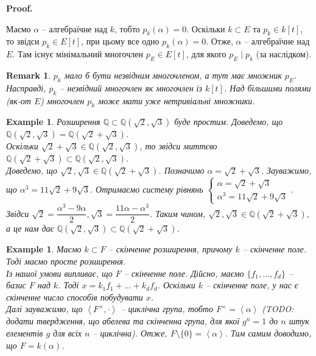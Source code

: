 \documentclass[a4paper, 10pt]{article}
\makeatletter
\theoremstyle{theoremdd}
\theoremstyle{theoremdd}
\theoremstyle{theoremdd}
\theoremstyle{theoremdd}
\theoremstyle{theoremdd}
\newtheorem{example}[theorem]{Example}
\theoremstyle{theoremdd}
\theoremstyle{theoremdd}
\theoremstyle{theoremdd}
\theoremstyle{theoremdd}
\theoremstyle{theoremdd}
\theoremstyle{theoremdd}
\newtheorem{remark}[theorem]{Remark}
\theoremstyle{theoremdd}
\theoremstyle{theoremdd}
\theoremstyle{theoremdd}
\theoremstyle{theoremdd}
\renewenvironment{proof}[1][Proof.\\]{\par
\pushQED{\hfill \qed}%
\normalfont \topsep6\p@\@plus6\p@\relax
\trivlist
\item\relax
{\bfseries
#1\@addpunct{.}}\hspace\labelsep\ignorespaces
}{%
\popQED\endtrivlist\@endpefalse
}
\makeatother
\begin{document}
\begin{proof}
Маємо $\alpha$ -- алгебраїчне над $k$, тобто $p_k(\alpha) = 0$. Оскільки $k \subset E$ та $p_k \in k[t]$, то звідси $p_k \in E[t]$, при цьому все одно $p_k(\alpha) = 0$. Отже, $\alpha$ -- алгебраїчне над $E$. Там існує мінімальний многочлен $p_E \in E[t]$, для якого $p_E \mid p_k$ (за наслідком).
\end{proof}

\begin{remark}
$p_k$ мало б бути незвідним многочленом, а тут має множник $p_E$. Насправді, $p_k$ -- незвідний многочлен як многочлен із $k[t]$. Над більшими полями (як-от $E$) многочлен $p_k$ може мати уже нетривіальні множники.
\end{remark}

\begin{example}
Розширення $\mathbb{Q} \subset \mathbb{Q}(\sqrt{2},\sqrt{3})$ буде простим. Доведемо, що $\mathbb{Q}(\sqrt{2},\sqrt{3}) = \mathbb{Q}(\sqrt{2}+\sqrt{3})$.\\
Оскільки $\sqrt{2}+\sqrt{3} \in \mathbb{Q}(\sqrt{2},\sqrt{3})$, то звідси миттєво $\mathbb{Q}(\sqrt{2}+\sqrt{3}) \subset \mathbb{Q}(\sqrt{2},\sqrt{3})$.\\
Доведемо, що $\sqrt{2},\sqrt{3} \in \mathbb{Q}(\sqrt{2}+\sqrt{3})$. Позначимо $\alpha = \sqrt{2} + \sqrt{3}$. Зауважимо, що $\alpha^3 = 11 \sqrt{2} + 9 \sqrt{3}$. Отримаємо систему рівнянь $\begin{cases} \alpha = \sqrt{2} + \sqrt{3} \\ \alpha^3 = 11 \sqrt{2} + 9 \sqrt{3} \end{cases}$. Звідси $\sqrt{2} = \dfrac{\alpha^3 - 9 \alpha}{2}, \sqrt{3} = \dfrac{11\alpha - \alpha^3}{2}$. Таким чином, $\sqrt{2}, \sqrt{3} \in \mathbb{Q}(\sqrt{2}+\sqrt{3})$, а це нам дає $\mathbb{Q}(\sqrt{2},\sqrt{3}) \subset \mathbb{Q}(\sqrt{2}+\sqrt{3})$.
\end{example}

\begin{example}
\label{finite_extension_of_a_finite_field_is_simple}
Маємо $k \subset F$ -- скінченне розширення, причому $k$ -- скінченне поле. Тоді маємо просте розширення.\\
Із нашої умови випливає, що $F$ -- скінченне поле. Дійсно, маємо $\{f_1,\dots,f_d\}$ -- базис $F$ над $k$. Тоді $x = k_1 f_1 + \dots + k_d f_d$. Оскільки $k$ -- скінченне поле, у нас є скінченне число способів побудувати $x$.\\
Далі зауважимо, що $\left<F^\times,\cdot \right>$ -- циклічна група, тобто $F^\times = \left< \alpha \right>$ (TODO: додати твердження, що абелева та скінченна група, для якої $g^n = 1$ до $n$ штук елементів $g$ для всіх $n$ -- циклічна). Отже, $F \setminus \{0\} = \left< \alpha \right>$. Тим самим доводимо, що $F = k(\alpha)$.
\end{example}
\end{document}
